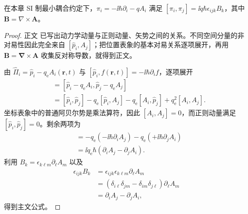 \begin{lemma}[动力学动量的交换子]
在本章 SI 制最小耦合约定下，$\pi_i=-\ii\hbar\partial_i-qA_i$ 满足 $[\pi_i,\pi_j]=\ii q\hbar\epsilon_{ijk}B_k$，其中 $\mathbf B=\nabla\times\mathbf A$。
\end{lemma}
\begin{proof}
正文 已写出动力学动量与正则动量、矢势之间的关系。不同空间分量的非对易性因此完全来自 $[\hat p_i,A_j]$；把位置表象的基本对易关系逐项展开，再用 $\mathbf B=\boldsymbol\nabla\times\mathbf A$ 收集反对称导数，就得到正文。


由 $\hat\Pi_i=\hat p_i-q_{\mathrm e} A_i(\mathbf r,t)$ 与 $[\hat p_i,f(\mathbf r,t)]=-\ii\hbar\partial_i f$，逐项展开
\begin{align*}
 [\hat\Pi_i,\hat\Pi_j]
 &=[\hat p_i-q_{\mathrm e} A_i,\hat p_j-q_{\mathrm e} A_j]\\
 &=[\hat p_i,\hat p_j]
 -q_{\mathrm e}[\hat p_i,A_j]
 -q_{\mathrm e}[A_i,\hat p_j]
 +q_{\mathrm e}^2[A_i,A_j].
\end{align*}
坐标表象中的普通阿贝尔势是乘法算符，因此 $[A_i,A_j]=0$，而正则动量满足 $[\hat p_i,\hat p_j]=0$。剩余两项为
\begin{align*}
 [\hat\Pi_i,\hat\Pi_j]
 &=-q_{\mathrm e}(-\ii\hbar\partial_iA_j)
 -q_{\mathrm e}(+\ii\hbar\partial_jA_i)\\
 &=\ii q_{\mathrm e}\hbar(\partial_iA_j-\partial_jA_i).
\end{align*}
利用 $B_k=\epsilon_{k\ell m}\partial_\ell A_m$ 以及
\begin{align*}
 \epsilon_{ijk}B_k
 &=\epsilon_{ijk}\epsilon_{k\ell m}\partial_\ell A_m\\
 &=(\delta_{i\ell}\delta_{jm}-\delta_{im}\delta_{j\ell})
 \partial_\ell A_m\\
 &=\partial_iA_j-\partial_jA_i,
\end{align*}
得到主文公式。
\end{proof}

